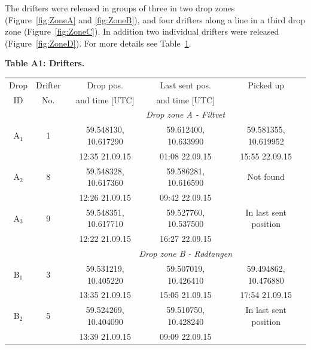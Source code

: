 \documentclass[12pt,a4paper,english]{article}
\begin{document}
The drifters were released in groups of three in two drop zones (Figure~\ref{fig:ZoneA} and \ref{fig:ZoneB}), and four drifters along a line in a third drop zone (Figure~\ref{fig:ZoneC}). In addition two individual drifters were released (Figure~\ref{fig:ZoneD}). For more details see Table~\ref{tab:Drifters}.


\begin{table}[tb]
{\bf Table A1: Drifters.}\\
\label{tab:Drifters}
\begin{tabular}{|c|c|ccc|} 
        \hline
        Drop & Drifter & Drop pos.            & Last sent pos.          & Picked up                  \\
        ID  & No.     & and time [UTC]       & and time [UTC]          &                            \\ \hline
             &         &          \multicolumn{3}{c|}{\textit{Drop zone A - Filtvet}}                 \\ 
        A$_1$& 1       & 59.548130, 10.617290 & 59.612400, 10.633990    & 59.581355, 10.619952       \\
             &         & 12:35 21.09.15       & 01:08 22.09.15          & 15:55 22.09.15             \\ 
        A$_2$& 8       & 59.548328, 10.617360 & 59.586281, 10.616590    & Not found                  \\
             &         & 12:26 21.09.15       & 09:42 22.09.15          &                            \\
        A$_3$& 9       & 59.548351, 10.617710 & 59.527760, 10.537500    & In last sent position      \\
             &         & 12:22 21.09.15       & 16:27 22.09.15          &                            \\ \hline 
             &         &          \multicolumn{3}{c|}{\textit{Drop zone B - R\o dtangen}}             \\
        B$_1$& 3       & 59.531219, 10.405220 & 59.507019, 10.426410    & 59.494862, 10.476880       \\
             &         & 13:35 21.09.15       & 15:05 21.09.15          & 17:54 21.09.15             \\
        B$_2$& 5       & 59.524269, 10.404090 & 59.510750, 10.428240    & In last sent position     \\
             &         & 13:39 21.09.15       & 09:09 22.09.15          &                            \\

\end{tabular}
\end{table}
\end{document}
